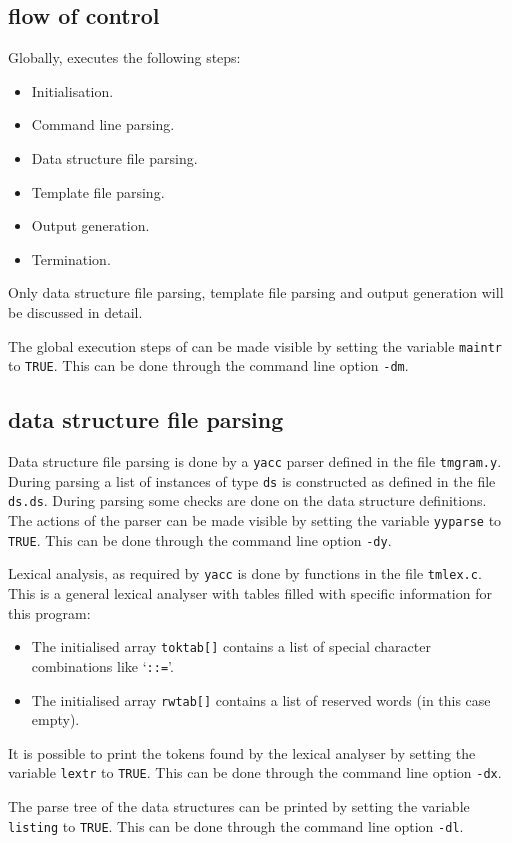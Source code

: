 \subsection{flow of control}
Globally, {\Tm} executes the following steps:
\begin{itemize}
\item Initialisation.
\item Command line parsing.
\item Data structure file parsing.
\item Template file parsing.
\item Output generation.
\item Termination.
\end{itemize}
Only data structure file parsing, template file parsing and output
generation will be discussed in detail.
\par
The global execution steps of {\Tm} can be made visible by setting
the variable \texttt{maintr} to \texttt{TRUE}.
This can be done through the command line option \texttt{-dm}.
\subsection{data structure file parsing}
Data structure file parsing is done by a \texttt{yacc} parser defined in
the file \texttt{tmgram.y}.
During parsing a list of instances of type \texttt{ds} is constructed as
defined in the file \texttt{ds.ds}.
During parsing some checks are done on the data structure definitions.
The actions of the parser can be made visible by
setting the variable \texttt{yyparse} to \texttt{TRUE}.
This can be done through the command line option \texttt{-dy}.
\par
Lexical analysis, as required by \texttt{yacc} is done by functions in the file
\texttt{tmlex.c}.
This is a general lexical analyser with tables filled with specific
information for this program:
\begin{itemize}
\item The initialised array \texttt{toktab[]} contains a list of special
character combinations like `\verb!::=!'.
\item The initialised array \texttt{rwtab[]} contains a list of reserved words
      (in this case empty).
\end{itemize}
It is possible to print the tokens found by
the lexical analyser by setting the variable \texttt{lextr} to \texttt{TRUE}.
This can be done through the command line option \texttt{-dx}.
\par
The parse tree of the data structures can be printed by setting the
variable \texttt{listing} to \texttt{TRUE}.
This can be done through the command line option \texttt{-dl}.

